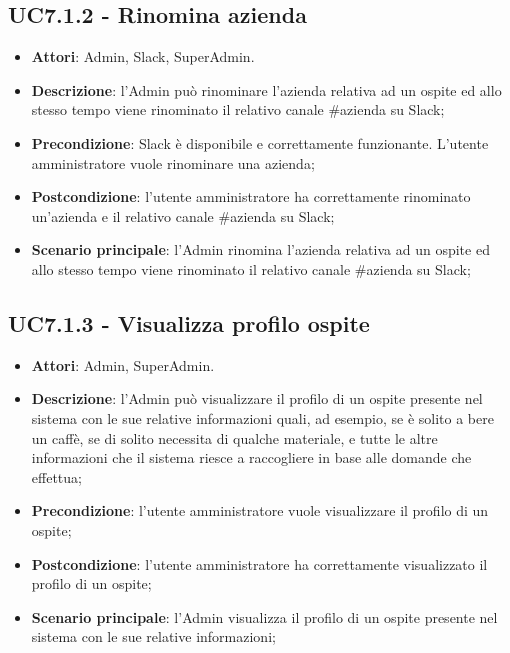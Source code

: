\documentclass[../AnalisiDeiRequisiti_v3.0.0.tex]{subfiles}
\begin{document}
\subsection{UC7.1.2 - Rinomina azienda} 
\label{sssec:UC7.1.2} 
\begin{itemize} 
\item \textbf{Attori}: Admin, Slack, SuperAdmin.
\item \textbf{Descrizione}: l'Admin può rinominare l'azienda relativa ad un ospite ed allo stesso tempo viene rinominato il relativo canale \#azienda su Slack;
\item \textbf{Precondizione}: Slack è disponibile e correttamente funzionante. L'utente amministratore vuole rinominare una azienda;
\item \textbf{Postcondizione}: l'utente amministratore ha correttamente rinominato un'azienda e il relativo canale \#azienda su Slack;
\item \textbf{Scenario principale}: l'Admin rinomina l'azienda relativa ad un ospite ed allo stesso tempo viene rinominato il relativo canale \#azienda su Slack;
\end{itemize} 
\subsection{UC7.1.3 - Visualizza profilo ospite} 
\label{sssec:UC7.1.3} 
\begin{itemize} 
\item \textbf{Attori}: Admin, SuperAdmin.
\item \textbf{Descrizione}: l'Admin può visualizzare il profilo di un ospite presente nel sistema con le sue relative informazioni quali, ad esempio, se è solito a bere un caffè, se di solito necessita di qualche materiale, e tutte le altre informazioni che il sistema riesce a raccogliere in base alle domande che effettua;
\item \textbf{Precondizione}: l'utente amministratore vuole visualizzare il profilo di un ospite;
\item \textbf{Postcondizione}: l'utente amministratore ha correttamente visualizzato il profilo di un ospite;
\item \textbf{Scenario principale}: l'Admin visualizza il profilo di un ospite presente nel sistema con le sue relative informazioni;
\end{itemize}

\newpage
\end{document}
